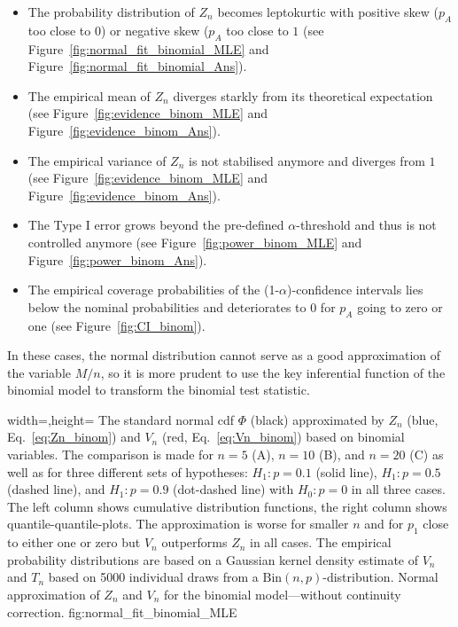\begin{itemize}
    \item The probability distribution of $Z_n$ becomes leptokurtic with positive skew (${p_A}$ too close to $0$) or negative skew (${p_A}$ too close to $1$ (see Figure~\ref{fig:normal_fit_binomial_MLE} and Figure~\ref{fig:normal_fit_binomial_Ans}).
    \item The empirical mean of $Z_n$ diverges starkly from its theoretical expectation (see Figure~\ref{fig:evidence_binom_MLE} and Figure~\ref{fig:evidence_binom_Ans}).
    \item The empirical variance of $Z_n$ is not stabilised anymore and diverges from $1$ (see Figure~\ref{fig:evidence_binom_MLE} and Figure~\ref{fig:evidence_binom_Ans}).
    \item The Type I error grows beyond the pre-defined $\alpha$-threshold and thus is not controlled anymore (see Figure~\ref{fig:power_binom_MLE} and Figure~\ref{fig:power_binom_Ans}).
    \item The empirical coverage probabilities of the (1-$\alpha$)-confidence intervals lies below the nominal probabilities and deteriorates to $0$ for $p_A$ going to zero or one (see Figure~\ref{fig:CI_binom}). 
\end{itemize}
In these cases, the normal distribution cannot serve as a good approximation of the variable $M/n$, so it is more prudent to use the key inferential function of the binomial model to transform the binomial test statistic.

  {width=\textwidth,height=\textheight}%
  {The standard normal cdf $\Phi$ (black) approximated by $Z_n$ (blue, Eq.~\ref{eq:Zn_binom}) and $V_n$ (red, Eq.~\ref{eq:Vn_binom}) based on binomial variables. The comparison is made for $n=5$ (A), $n=10$ (B), and $n=20$ (C) as well as for three different sets of hypotheses: $H_1: p=0.1$ (solid line), $H_1: p=0.5$ (dashed line), and $H_1: p=0.9$ (dot-dashed line) with $H_0: p=0$ in all three cases. The left column shows cumulative distribution functions, the right column shows quantile-quantile-plots. The approximation is worse for smaller $n$ and for $p_1$ close to either one or zero but $V_n$ outperforms $Z_n$ in all cases. The empirical probability distributions are based on a Gaussian kernel density estimate of $V_n$ and $T_n$ based on 5000 individual draws from a $\text{Bin}(n,p)$-distribution.}%
  {Normal approximation of $Z_n$ and $V_n$ for the binomial model---without continuity correction.}%
  {fig:normal_fit_binomial_MLE}%

